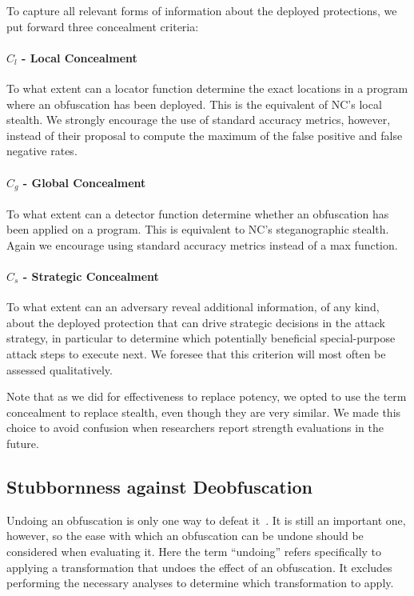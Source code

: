 To capture all relevant forms of information about the deployed protections, we put forward three concealment criteria: 

\paragraph{$C_l$ - Local Concealment} To what extent can a  locator function determine the exact locations in a program where an obfuscation has been deployed. This is the equivalent of NC's local stealth. We strongly encourage the use of standard accuracy metrics, however, instead of their proposal to compute the maximum of the false positive and false negative rates. 

\paragraph{$C_g$ - Global Concealment} To what extent can a detector function determine whether an obfuscation has been applied on a program. This is equivalent to NC's steganographic stealth. Again we encourage using standard accuracy metrics instead of a max function. 

\paragraph{$C_s$ - Strategic Concealment} To what extent can an adversary reveal additional information, of any kind, about the deployed protection that can drive strategic decisions in the attack strategy, in particular to determine which potentially beneficial special-purpose attack steps to execute next. We foresee that this criterion will most often be assessed qualitatively.

\vspace{0.2cm}

Note that as we did for effectiveness to replace potency, we opted to use the term concealment to replace stealth, even though they are very similar. We made this choice to avoid confusion when researchers report strength evaluations in the future. 

\subsection{Stubbornness against Deobfuscation}
Undoing an obfuscation is only one way to defeat it~\cite{emse2019}. It is still an important one, however, so the ease with which an obfuscation can be undone should be considered when evaluating it. Here the term ``undoing'' refers specifically to applying a transformation that undoes the effect of an obfuscation. It excludes performing the necessary analyses to determine which transformation to apply. 

